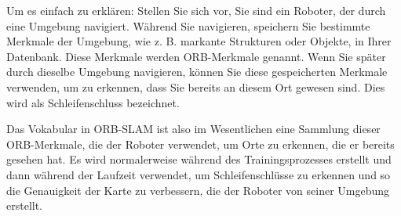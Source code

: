 Um es einfach zu erklären: Stellen Sie sich vor, Sie sind ein Roboter, der durch eine Umgebung navigiert. Während Sie navigieren, speichern Sie bestimmte Merkmale der Umgebung, wie z. B. markante Strukturen oder Objekte, in Ihrer Datenbank. Diese Merkmale werden ORB-Merkmale genannt. Wenn Sie später durch dieselbe Umgebung navigieren, können Sie diese gespeicherten Merkmale verwenden, um zu erkennen, dass Sie bereits an diesem Ort gewesen sind. Dies wird als Schleifenschluss bezeichnet.

Das Vokabular in ORB-SLAM ist also im Wesentlichen eine Sammlung dieser ORB-Merkmale, die der Roboter verwendet, um Orte zu erkennen, die er bereits gesehen hat. Es wird normalerweise während des Trainingsprozesses erstellt und dann während der Laufzeit verwendet, um Schleifenschlüsse zu erkennen und so die Genauigkeit der Karte zu verbessern, die der Roboter von seiner Umgebung erstellt.

\cite{ORBSLAM3TRO}

